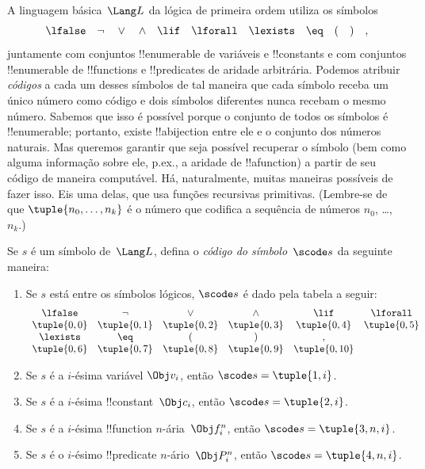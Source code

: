 \documentclass[../../../include/open-logic-section]{subfiles}
\begin{document}

A linguagem básica~$\Lang L$ da lógica de primeira ordem utiliza os símbolos
\[
\lfalse \quad \lnot \quad \lor \quad \land \quad \lif \quad \lforall
\quad \lexists \quad \eq \quad ( \quad ) \quad ,
\]
juntamente com conjuntos !!{enumerable} de variáveis e !!{constant}s e
com conjuntos !!{enumerable} de !!{function}s e !!{predicate}s de
aridade arbitrária. Podemos atribuir \emph{códigos} a cada um desses
símbolos de tal maneira que cada símbolo receba um único número como
código e dois símbolos diferentes nunca recebam o mesmo número. Sabemos
que isso é possível porque o conjunto de todos os símbolos é
!!{enumerable}; portanto, existe !!a{bijection} entre ele e o conjunto
dos números naturais. Mas queremos garantir que seja possível recuperar
o símbolo (bem como alguma informação sobre ele, p.ex., a aridade
de !!a{function}) a partir de seu código de maneira computável. Há,
naturalmente, muitas maneiras possíveis de fazer isso. Eis uma delas,
que usa funções recursivas primitivas. (Lembre-se de que
$\tuple{n_0, \dots, n_k}$ é o número que codifica a sequência de
números $n_0$, \dots, $n_k$.)

\begin{defn}
Se $s$ é um símbolo de~$\Lang L$, defina o \emph{código do
  símbolo}~$\scode s$ da seguinte maneira:
\begin{enumerate}
\item Se $s$ está entre os símbolos lógicos, $\scode s$ é dado pela
  tabela a seguir:
\[
\begin{array}{cccccccccc}
  \lfalse & \lnot & \lor & \land & \lif & \lforall \\
\tuple{0, 0} & \tuple{0, 1} & \tuple{0, 2} & \tuple{0, 3} &
\tuple{0, 4} & \tuple{0, 5} \\
\lexists & \eq & ( & ) & ,\\
\tuple{0, 6} & \tuple{0, 7} &
\tuple{0, 8} & \tuple{0, 9} & \tuple{0, 10}
\end{array}
\]
\item Se $s$ é a $i$-ésima variável $\Obj v_i$, então
  $\scode s = \tuple{1, i}$.
\item Se $s$ é a $i$-ésima !!{constant}~$\Obj c_i$, então
  $\scode s = \tuple{2, i}$.
\item Se $s$ é a $i$-ésima !!{function} $n$-ária~$\Obj f_i^n$, então
  $\scode s = \tuple{3, n, i}$.
\item Se $s$ é o $i$-ésimo !!{predicate} $n$-ário~$\Obj P_i^n$, então
  $\scode s = \tuple{4, n, i}$.
\end{enumerate}
\end{defn}
\end{document}
